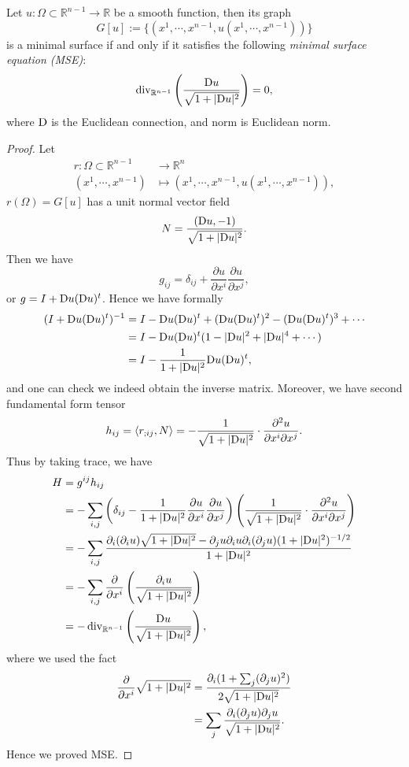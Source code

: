 \begin{lem}
    Let $u:\Omega\subset\mathbb{R}^{n-1}\to\mathbb{R}$ be a smooth function, then its graph
    \[G[u]:=\{(x^1,\cdots,x^{n-1},u(x^1,\cdots,x^{n-1}))\}\]
    is a minimal surface if and only if it satisfies the following \emph{minimal surface equation (MSE)}:
    \[\operatorname{div}_{\mathbb{R}^{n-1}}\left(\frac{\mathrm{D} u}{\sqrt{1+|\mathrm{D} u|^2}}\right)=0,\]
    where $\mathrm{D}$ is the Euclidean connection, and norm is Euclidean norm.
\end{lem}
\begin{proof}
    Let
    \begin{align*}
        r:\Omega\subset\mathbb{R}^{n-1}&\to\mathbb{R}^n\\
        (x^1,\cdots,x^{n-1})&\mapsto(x^1,\cdots,x^{n-1},u(x^1,\cdots,x^{n-1})),
    \end{align*}
    $r(\Omega)=G[u]$ has a unit normal vector field
    \[N=\frac{(\mathrm{D} u,-1)}{\sqrt{1+|\mathrm{D} u|^2}}.\]
    Then we have
    \[g_{ij}=\delta_{ij}+\frac{\partial u}{\partial{x^i}}\frac{\partial u}{\partial{x^j}},\]
    or $g=I+\mathrm{D} u(\mathrm{D} u)^t$.
    Hence we have formally
    \begin{align*}
        (I+\mathrm{D} u(\mathrm{D} u)^t)^{-1}&=I-\mathrm{D} u(\mathrm{D} u)^t+(\mathrm{D} u(\mathrm{D} u)^t)^2-(\mathrm{D} u(\mathrm{D} u)^t)^3+\cdots\\
        &=I-\mathrm{D} u(\mathrm{D} u)^t(1-|\mathrm{D} u|^2+|\mathrm{D} u|^4+\cdots)\\
        &=I-\frac{1}{1+|\mathrm{D} u|^2}\mathrm{D} u(\mathrm{D} u)^t,
    \end{align*}
    and one can check we indeed obtain the inverse matrix.
    Moreover, we have second fundamental form tensor
    \[h_{ij}=\langle r_{;ij},N\rangle=-\frac{1}{\sqrt{1+|\mathrm{D} u|^2}}\cdot\frac{\partial^2u}{\partial{x^i}\partial{x^j}}.\]
    Thus by taking trace, we have
    \begin{align*}
        H&=g^{ij}h_{ij}\\
        &=-\sum_{i,j}\left(\delta_{ij}-\frac{1}{1+|\mathrm{D} u|^2}\frac{\partial{u}}{\partial{x^i}}\frac{\partial{u}}{\partial{x^j}}\right)\left(\frac{1}{\sqrt{1+|\mathrm{D} u|^2}}\cdot\frac{\partial^2u}{\partial{x^i}\partial{x^j}}\right)\\
        &=-\sum_{i,j}\frac{\partial_i(\partial_iu)\sqrt{1+|\mathrm{D} u|^2}-\partial_ju\partial_iu\partial_i(\partial_ju)(1+|\mathrm{D} u|^2)^{-1/2}}{1+|\mathrm{D} u|^2}\\
        &=-\sum_{i,j}\frac{\partial{}}{\partial{x^i}}\left(\frac{\partial_iu}{\sqrt{1+|\mathrm{D} u|^2}}\right)\\
        &=-\operatorname{div}_{\mathbb{R}^{n-1}}\left(\frac{\mathrm{D} u}{\sqrt{1+|\mathrm{D} u|^2}}\right),
    \end{align*}
    where we used the fact
    \begin{align*}
        \frac{\partial{}}{\partial{x^i}}\sqrt{1+|\mathrm{D} u|^2}&=\frac{\partial_i(1+\sum_j(\partial_ju)^2)}{2\sqrt{1+|\mathrm{D} u|^2}}\\
        &=\sum_j\frac{\partial_i(\partial_j u)\partial_ju}{\sqrt{1+|\mathrm{D} u|^2}}.
    \end{align*}
    Hence we proved MSE.
\end{proof}

